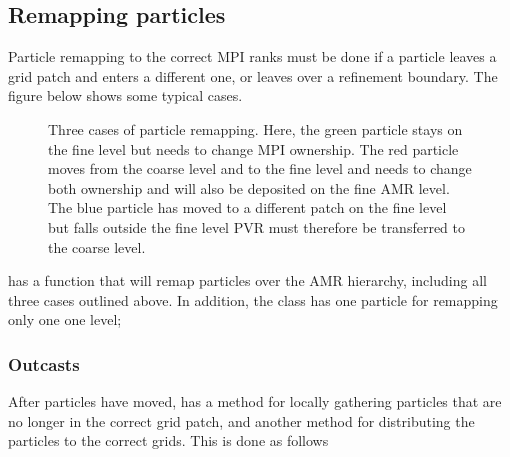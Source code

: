 \documentclass[letterpaper,10pt,english]{sphinxmanual}
\let\sphinxpxdimen\pdfpxdimen\else\newdimen\sphinxpxdimen
\begin{document}
\subsection{Remapping particles}
\label{\detokenize{ParticleData:remapping-particles}}
Particle remapping to the correct MPI ranks must be done if a particle leaves a grid patch and enters a different one, or leaves over a refinement boundary.
The figure below shows some typical cases.

\begin{figure}[htb]
\centering
\capstart

\noindent\sphinxincludegraphics[width=480\sphinxpxdimen]{{outcast}.png}
\caption{Three cases of particle remapping. Here, the green particle stays on the fine level but needs to change MPI ownership.
The red particle moves from the coarse level and to the fine level and needs to change both ownership and will also be deposited on the fine AMR level.
The blue particle has moved to a different patch on the fine level but falls outside the fine level PVR must therefore be transferred to the coarse level.}\label{\detokenize{ParticleData:id2}}\end{figure}

 has a function that will remap particles over the  AMR hierarchy, including all three cases outlined above.
In addition, the class has one particle for remapping only one one level;

\begin{sphinxVerbatim}[commandchars=\\\{\},formatcom=\scriptsize]
                          
        
\end{sphinxVerbatim}


\subsubsection{Outcasts}
\label{\detokenize{ParticleData:outcasts}}
After particles have moved,  has a method for locally gathering particles that are no longer in the correct grid patch, and another method for distributing the particles to the correct grids.
This is done as follows
\end{document}
